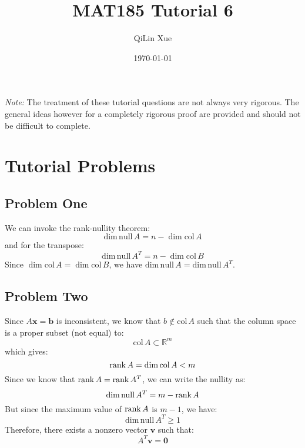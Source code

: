 \documentclass{article}
\title{MAT185 Tutorial 6}
\author{QiLin Xue}
\date{\today}
\newcommand{\nullity}[1]{\mathrm{dim\,null\,} #1}
\newcommand{\col}[1]{\mathrm{col\,} #1}
\begin{document}
\maketitle
\textit{Note:} The treatment of these tutorial questions are not always very rigorous. The general ideas however for a completely rigorous proof are provided and should not be difficult to complete.
\section{Tutorial Problems}
\subsection*{Problem One}
We can invoke the rank-nullity theorem:
\begin{equation}
    \nullity A = n - \dim \col A
\end{equation}
and for the transpose:
\begin{equation}
    \nullity A^T = n -\dim \col B
\end{equation}
Since $\dim\col A = \dim\col B$, we have $\nullity A = \nullity A^T$.

\subsection*{Problem Two}
Since $A\bm{x}=\bm{b}$ is inconsistent, we know that $b \not\in \col A$ such that the column space is a proper subset (not equal) to:
\begin{equation}
    \col A \subset \mathbb{R}^m
\end{equation}
which gives:
\begin{equation}
    \rank A = \dim \col A < m
\end{equation}
Since we know that $\rank A = \rank A^T$, we can write the nullity as:
\begin{equation}
    \nullity A^T = m - \rank A
\end{equation}
But since the maximum value of $\rank A$ is $m-1$, we have:
\begin{equation}
    \nullity A^T \ge 1
\end{equation}
Therefore, there exists a nonzero vector $\bm{v}$ such that:
\begin{equation}
    A^T\bm{v}=\bm{0}
\end{equation}
\end{document}
